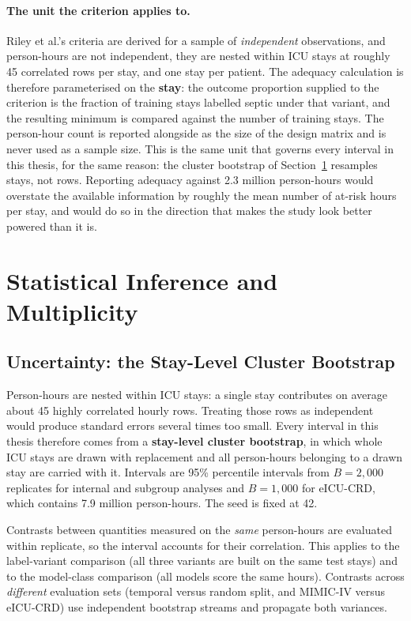 \paragraph{The unit the criterion applies to.} Riley et al.'s criteria are
derived for a sample of \emph{independent} observations, and person-hours are
not independent, they are nested within ICU stays at roughly 45 correlated
rows per stay, and one stay per patient. The adequacy calculation is therefore
parameterised on the \textbf{stay}: the outcome proportion supplied to the
criterion is the fraction of training stays labelled septic under that variant,
and the resulting minimum is compared against the number of training stays. The
person-hour count is reported alongside as the size of the design matrix and is
never used as a sample size. This is the same unit that governs every interval
in this thesis, for the same reason: the cluster bootstrap of
Section~\ref{sec:inference} resamples stays, not rows. Reporting adequacy
against 2.3 million person-hours would overstate the available information by
roughly the mean number of at-risk hours per stay, and would do so in the
direction that makes the study look better powered than it is.


\section{Statistical Inference and Multiplicity}
\label{sec:inference}

\subsection{Uncertainty: the Stay-Level Cluster Bootstrap}

Person-hours are nested within ICU stays: a single stay contributes on average
about 45 highly correlated hourly rows. Treating those rows as independent
would produce standard errors several times too small. Every interval in this
thesis therefore comes from a \textbf{stay-level cluster bootstrap}, in which
whole ICU stays are drawn with replacement and all person-hours belonging to a
drawn stay are carried with it. Intervals are 95\% percentile intervals from
$B = 2{,}000$ replicates for internal and subgroup analyses and $B = 1{,}000$
for eICU-CRD, which contains 7.9 million person-hours. The seed is fixed at 42.

Contrasts between quantities measured on the \emph{same} person-hours are
evaluated within replicate, so the interval accounts for their correlation.
This applies to the label-variant comparison (all three variants are built on
the same test stays) and to the model-class comparison (all models score the
same hours). Contrasts across \emph{different} evaluation sets (temporal
versus random split, and MIMIC-IV versus eICU-CRD) use independent bootstrap
streams and propagate both variances.

